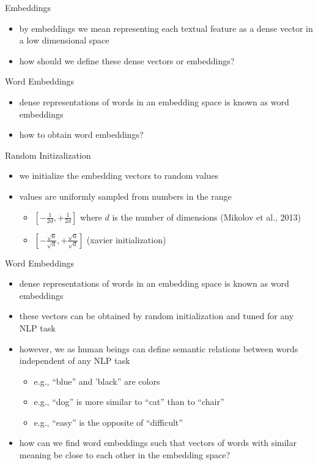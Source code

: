 

\begin{frame}{Embeddings}
    \begin{itemize}
        \item<1-> by embeddings we mean representing each textual feature as a dense vector in a low dimensional space
        \item<2-> how should we define these dense vectors or embeddings?
    \end{itemize}
\end{frame}
\begin{frame}{Word Embeddings}
    \begin{itemize}
        \item dense representations of words in an embedding space is known as word embeddings
        \item how to obtain word embeddings?  
    \end{itemize}
\end{frame}
\begin{frame}{Random Initizalization}
    \begin{itemize}
        \item<1-> we initialize the embedding vectors to random values
        \item<2-> values are uniformly sampled from numbers in the range
        \begin{itemize}
            \item<3->  $[-\frac{1}{2d}, +\frac{1}{2d} ] $ where $d$ is the number of dimensions (Mikolov et al., 2013)
            \item<4->  $[-\frac{\sqrt{6}}{\sqrt{d}}, +\frac{\sqrt{6}}{\sqrt{d}} ] $ (xavier initialization)
        \end{itemize}
    \end{itemize}
\end{frame}
\begin{frame}{Word Embeddings}
    \begin{itemize}
        \item<1-> dense representations of words in an embedding space is known as word embeddings
        \item<2-> these vectors can be obtained by random initialization and tuned for any NLP task
        \item<3-> however, we as human beings can define semantic relations between words independent of any NLP task
        \begin{itemize}
        \item e.g., ``blue'' and  'black'' are colors
        \item e.g., ``dog'' is more similar to ``cat'' than to ``chair'' 
        \item e.g., ``easy'' is the opposite of ``difficult''
        \end{itemize}
        \item<4-> how can we find word embeddings such that vectors of words with similar meaning be close to each other in the embedding space?
    \end{itemize}
\end{frame}
